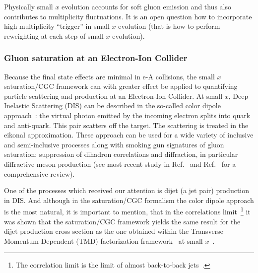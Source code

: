 Physically small $x$ evolution accounts for soft gluon emission and thus 
also contributes to multiplicity fluctuations. It is an open question how to 
incorporate high multiplicity ``trigger'' in small $x$ evolution (that is how to perform 
reweighting at each step of small $x$ evolution). 

%
%
%
%
%



\subsubsection*{Gluon saturation at an Electron-Ion Collider} 
Because the final state effects are  minimal in e-A collisions, 
the small $x$ saturation/CGC framework can with greater effect be applied to 
quantifying particle scattering and production at an Electron-Ion Collider. 
At small $x$, Deep Inelastic Scattering (DIS) can be described in the so-called color 
dipole approach~\cite{Gunion:1976iy,Nussinov:1975mw,Nussinov:1975qb,Marquet:2009ca}: 
the virtual photon emitted by the incoming electron splits into quark and anti-quark.
This pair scatters off the target. The scattering is treated in the eikonal approximation.
These approach can be used for a wide variety of inclusive and semi-inclusive processes  
along with  smoking gun signatures of gluon saturation: suppression of dihadron 
correlations 
 and diffraction, in particular diffractive meson production 
(see most recent study in Ref.~\cite{Mantysaari:2017slo}
and Ref.~\cite{Aschenauer:2017jsk} 
for a comprehensive review). 



One of the processes which received our attention  is dijet (a jet pair) production in DIS.
And although in the saturation/CGC formalism the color dipole approach is the most natural, 
it is important to mention, that in the correlations limit~\footnote{The correlation limit is  
the limit of almost back-to-back jets~\cite{Dominguez:2011wm,Dominguez:2011br}.}
it was shown that the saturation/CGC framework yields the same result for the dijet production
cross section as the one obtained within the Transverse Momentum Dependent (TMD) factorization 
framework~\cite{Mulders:2000sh,Bomhof:2006dp,Meissner:2007rx} at small $x$~\cite{Metz:2011wb,Dominguez:2011wm}. 



